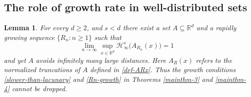 \documentclass[a4paper,11pt]{amsart}
\newtheorem{lem}[thm]{\bf Lemma}
\numberwithin{equation}{section}
\begin{document}
\subsection{The role of growth rate in well-distributed sets} \label{uniformly-welldistributed-section} 
\begin{lem} 
For every $d \geq 2$,  and $s < d$ there exist a set $A \subseteq \mathbb R^d$ and a rapidly growing sequence $\{R_n: n \geq 1\}$ such that  
\begin{equation} \label{well-distributed-def-2}
\lim_{n \rightarrow \infty} \sup_{x \in \mathbb R^d} \mathcal H_{\infty}^s \bigl(A_{R_n}(x)\bigr) = 1  
\end{equation}   
and yet $A$ avoids infinitely many large distances. Here $A_R(x)$ refers to the normalized truncations of $A$ defined in \eqref{def-ARx}.   
\vskip0.1in
\noindent Thus the growth conditions \eqref{slower-than-lacunary} and \eqref{Rn-growth} in Theorems \ref{mainthm-3} and \ref{mainthm-4} cannot be dropped.  
\end{lem} 
\end{document}
